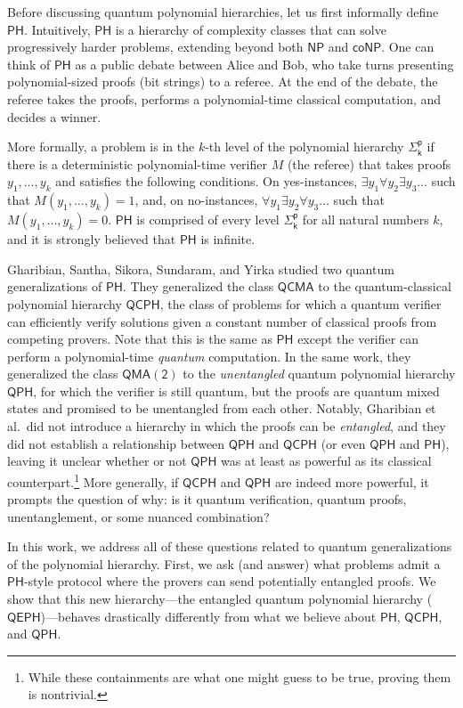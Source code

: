 \documentclass[11pt]{article}
\theoremstyle{definition}
\newcommand{\class}[1]{\ensuremath{\mathsf{#1}}\xspace}
\newcommand{\NP}{\class{NP}}
\newcommand{\coNP}{\class{coNP}}
\newcommand{\QCMA}{\class{QCMA}}
\newcommand{\QMAk}[1][k]{\class{QMA(#1)}}
\newcommand{\QMAtwo}{\QMAk[2]}
\newcommand{\PH}{\class{PH}}
\newcommand{\Sigmai}[1][i]{\class{\Sigma^{p}_{#1}}}
\newcommand{\QCPH}{\class{QCPH}}
\newcommand{\QPH}{\class{QPH}}
\newcommand{\QEPH}{\class{QEPH}}
\begin{document}
Before discussing quantum polynomial hierarchies, let us first informally define $\PH$. 
Intuitively, $\PH$ is a hierarchy of complexity classes that can solve progressively harder problems, extending beyond both \NP and \coNP.
One can think of $\PH$ as a public debate between Alice and Bob, who take turns presenting polynomial-sized proofs (bit strings) to a referee. 
At the end of the debate, the referee takes the proofs, performs a polynomial-time classical computation, and decides a winner. 

More formally, a problem is in the $k$-th level of the polynomial hierarchy $\Sigmai[k]$ if there is a deterministic polynomial-time verifier $M$ (the referee) that takes proofs $y_1, \dots, y_k$ and satisfies the following conditions. On yes-instances, $\exists y_1 \forall y_2 \exists y_3 \ldots$ such that $M(y_1,\ldots,y_k)=1$, and, on no-instances, $\forall y_1 \exists y_2 \forall y_3 \ldots$ such that $M(y_1,\ldots,y_k)=0$. $\PH$ is comprised of every level $\Sigmai[k]$ for all natural numbers $k$, and it is strongly believed that $\PH$ is infinite.




Gharibian, Santha, Sikora, Sundaram, and Yirka \cite{GSSSY22_qph} studied two quantum generalizations of $\PH$. 
They generalized the class $\QCMA$ to the quantum-classical polynomial hierarchy $\QCPH$, the class of problems for which a quantum verifier can efficiently verify solutions given a constant number of classical proofs from competing provers. Note that this is the same as $\PH$ except the verifier can perform a polynomial-time \emph{quantum} computation.
In the same work, they generalized the class $\QMAtwo$ to the \emph{unentangled} quantum polynomial hierarchy $\QPH$, 
for which the verifier is still quantum, but the proofs are quantum mixed states and promised to be unentangled from each other.
Notably, Gharibian et al.\ did not introduce a hierarchy in which the proofs can be \emph{entangled}, and they did not establish a relationship between $\QPH$ and $\QCPH$ (or even $\QPH$ and $\PH$), leaving it unclear whether or not $\QPH$ was at least as powerful as its classical counterpart.\footnote{While these containments are what one might guess to be true, proving them is nontrivial.} 
More generally, if $\QCPH$ and $\QPH$ are indeed more powerful, it prompts the question of why: is it quantum verification, quantum proofs, unentanglement, or some nuanced combination?

In this work, we address all of these questions related to quantum generalizations of the polynomial hierarchy.
First, we ask (and answer) what problems admit a $\PH$-style protocol where the provers can send potentially entangled proofs. 
We show that this new hierarchy---the entangled quantum polynomial hierarchy ($\QEPH$)---behaves drastically differently from what we believe about $\PH$, $\QCPH$, and $\QPH$.
\end{document}
